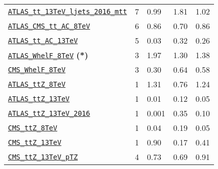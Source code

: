 \begin{table}[htbp]
\begin{tabular}{l|C{1.1cm}|C{2.1cm}|C{2.5cm}|C{2.5cm}}
\href{https://arxiv.org/abs/1908.07305}{\tt ATLAS\_tt\_13TeV\_ljets\_2016\_mtt} & 7 & 0.99   & 1.81   & 1.02       \\
\href{https://arxiv.org/abs/1709.05327}{\tt ATLAS\_CMS\_tt\_AC\_8TeV} & 6 &  0.86  &  0.70  & 0.86       \\
\href{https://inspirehep.net/literature/1743677}{\tt ATLAS\_tt\_AC\_13TeV} & 5 &  0.03  & 0.32   &  0.26     \\
\href{https://arxiv.org/abs/1612.02577}{\tt ATLAS\_WhelF\_8TeV}  {{\bf (*)}} & 3 &  1.97  & 1.30   & 1.38       \\
\href{https://arxiv.org/abs/1605.09047}{\tt CMS\_WhelF\_8TeV} & 3 &  0.30  & 0.64   &  0.58    \\
\midrule
\href{https://arxiv.org/abs/1509.05276}{\tt ATLAS\_ttZ\_8TeV} & 1 & 1.31   &  0.76     &  1.24      \\
\href{https://arxiv.org/abs/1609.01599}{\tt ATLAS\_ttZ\_13TeV} & 1 &  0.01    & 0.12   &  0.05     \\
\href{https://arxiv.org/abs/1901.03584}{\tt ATLAS\_ttZ\_13TeV\_2016} & 1 & 0.001   &  0.35   &  0.10     \\
\href{https://arxiv.org/abs/1510.01131}{\tt CMS\_ttZ\_8TeV} & 1 &  0.04    &  0.19   &  0.05      \\
\href{https://arxiv.org/abs/1711.02547}{\tt CMS\_ttZ\_13TeV} & 1 & 0.90    & 0.17   &  0.41      \\
\href{https://arxiv.org/abs/1907.11270}{\tt CMS\_ttZ\_13TeV\_pTZ} & 4 &  0.73  &  0.69   & 0.91      \\

\end{tabular}
\end{table}
